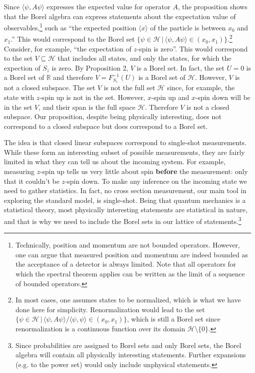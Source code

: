 \documentclass[11pt, executivepaper]{article}
\begin{document}
Since $\langle \psi , A \psi \rangle$ expresses the expected value for operator $A$, the proposition shows that the Borel algebra can express statements about the expectation value of observables,\footnote{Technically, position and momentum are not bounded operators. However, one can argue that measured position and momentum are indeed bounded as the acceptance of a detector is always limited. Note that all operators for which the spectral theorem applies can be written as the limit of a sequence of bounded operators.} such as ``the expected position $\langle x \rangle$ of the particle is between $x_0$ and $x_1$.'' This would correspond to the Borel set $\{ \psi \in \mathcal{H} \, | \, \langle \psi , A \psi \rangle \in (x_0, x_1) \}$.\footnote{In most cases, one assumes states to be normalized, which is what we have done here for simplicity. Renormalization would lead to the set $\{ \psi \in \mathcal{H} \, | \, \langle \psi , A \psi \rangle / \langle \psi , \psi \rangle \in (x_0, x_1) \}$, which is still a Borel set since renormalization is a continuous function over its domain $\mathcal{H} \setminus \{ 0 \}$.} Consider, for example, ``the expectation of $z$-spin is zero''. This would correspond to the set $V \subseteq \mathcal{H}$ that includes all states, and only the states, for which the expection of $S_z$ is zero. By Proposition 2, $V$ is a Borel set. In fact, the set $U = {0}$ is a Borel set of $\mathbb{R}$ and therefore $V = F_{S_z}^{-1}(U)$ is a Borel set of $\mathcal{H}$. However, $V$ is not a closed subspace. The set $V$ is not the full set $\mathcal{H}$ since, for example, the state with $z$-spin up is not in the set. However, $x$-spin up and $x$-spin down will be in the set $V$, and their span is the full space $\mathcal{H}$. Therefore $V$ is not a closed subspace. Our proposition, despite being physically interesting, does not correspond to a closed subspace but does correspond to a Borel set.

The idea is that closed linear subspaces correspond to single-shot measurements. While these form an interesting subset of possible measurements, they are fairly limited in what they can tell us about the incoming system. For example, measuring $z$-spin up tells us very little about spin \textbf{before} the measurement: only that it couldn't be $z$-spin down. To make any inference on the incoming state we need to gather statistics. In fact, no cross section measurement, our main tool in exploring the standard model, is single-shot. Being that quantum mechanics is a statistical theory, most physically interesting statements are statistical in nature, and that is why we need to include the Borel sets in our lattice of statements.\footnote{Since probabilities are assigned to Borel sets and only Borel sets, the Borel algebra will contain all physically interesting statements. Further expansions (e.g. to the power set) would only include unphysical statements.}
\end{document}
